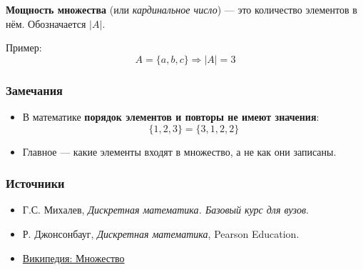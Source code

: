 \textbf{Мощность множества} (или \textit{кардинальное число}) — это количество элементов в нём. Обозначается $|A|$.

Пример:
\[
A = \{a, b, c\} \Rightarrow |A| = 3
\]

\subsubsection{Замечания}

\begin{itemize}[leftmargin=*]
  \item В математике \textbf{порядок элементов и повторы не имеют значения}:
  \[
  \{1, 2, 3\} = \{3, 1, 2, 2\}
  \]
  \item Главное — какие элементы входят в множество, а не как они записаны.
\end{itemize}

\subsubsection{Источники}

\begin{itemize}
  \item Г.С. Михалев, \textit{Дискретная математика. Базовый курс для вузов}.
  \item Р. Джонсонбауг, \textit{Дискретная математика}, Pearson Education.
  \item \href{https://ru.wikipedia.org/wiki/Множество}{Википедия: Множество}
\end{itemize}
